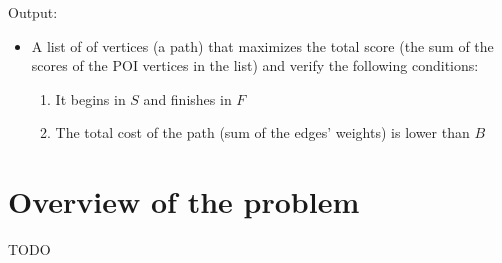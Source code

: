 \documentclass{article}
\begin{document}
Output:

\begin{itemize}
    \item A list of of vertices (a path) that maximizes the total score (the sum of the scores of the POI vertices in the list) and verify the following conditions:
    \begin{enumerate}
        \item It begins in $S$ and finishes in $F$
        \item The total cost of the path (sum of the edges' weights) is lower than $B$
    \end{enumerate} 
\end{itemize}


\section{Overview of the problem}

TODO
\end{document}
